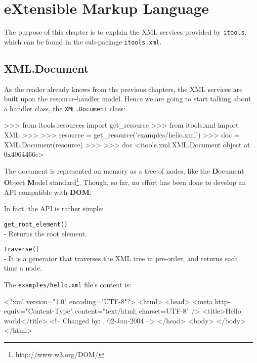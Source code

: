 \chapter{eXtensible Markup Language}

The purpose of this chapter is to explain the XML services provided by
{\tt itools}, which can be found in the sub-package {\tt itools.xml}.

\section{XML.Document}

As the reader already knows from the previous chapters, the XML services
are built upon the resource-handler model. Hence we are going to start
talking about a handler class, the {\tt XML.Document} class:

\begin{code}
    >>> from itools.resources import get_resource
    >>> from itools.xml import XML
    >>>
    >>> resource = get_resource('examples/hello.xml')
    >>> doc = XML.Document(resource)
    >>>
    >>> doc
    <itools.xml.XML.Document object at 0x4064466c>
\end{code}

The document is represented on memory as a tree of nodes, like the
{\bf D}ocument {\bf O}bject {\bf M}odel
standard\footnote{http://www.w3.org/DOM/}. Though, so far, no effort
has been done to develop an API compatible with {\bf DOM}.

In fact, the API is rather simple:

\begin{api}
    {\tt get\_root\_element()}\\
    - Returns the root element.

    {\tt traverse()}\\
    - It is a generator that traverses the XML tree in pre-order, and returns
    each time a node.
\end{api}

The {\tt examples/hello.xml} file's content is:

\begin{code}
    <?xml version="1.0" encoding="UTF-8"?>
    <html>
      <head>
        <meta http-equiv="Content-Type" content="text/html; charset=UTF-8" />
        <title>Hello world</title>
        <!-- Changed by: , 02-Jun-2004 -->
      </head>
      <body>
      </body>
    </html>
\end{code}

